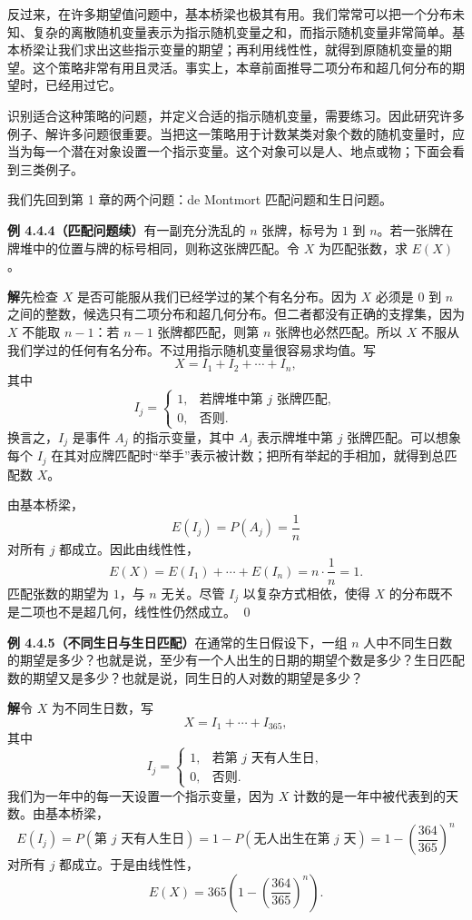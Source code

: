 \documentclass[UTF8, 12pt, fontset=fandol, oneside]{ctexart}
\begin{document}
反过来，在许多期望值问题中，基本桥梁也极其有用。我们常常可以把一个分布未知、复杂的离散随机变量表示为指示随机变量之和，而指示随机变量非常简单。基本桥梁让我们求出这些指示变量的期望；再利用线性性，就得到原随机变量的期望。这个策略非常有用且灵活。事实上，本章前面推导二项分布和超几何分布的期望时，已经用过它。

识别适合这种策略的问题，并定义合适的指示随机变量，需要练习。因此研究许多例子、解许多问题很重要。当把这一策略用于计数某类对象个数的随机变量时，应当为每一个潜在对象设置一个指示变量。这个对象可以是人、地点或物；下面会看到三类例子。

我们先回到第 1 章的两个问题：de Montmort 匹配问题和生日问题。

\noindent\textbf{例 4.4.4（匹配问题续）}\quad 有一副充分洗乱的 $n$ 张牌，标号为 $1$ 到 $n$。若一张牌在牌堆中的位置与牌的标号相同，则称这张牌匹配。令 $X$ 为匹配张数，求 $E(X)$。

\noindent\textbf{解}\quad 先检查 $X$ 是否可能服从我们已经学过的某个有名分布。因为 $X$ 必须是 $0$ 到 $n$ 之间的整数，候选只有二项分布和超几何分布。但二者都没有正确的支撑集，因为 $X$ 不能取 $n-1$：若 $n-1$ 张牌都匹配，则第 $n$ 张牌也必然匹配。所以 $X$ 不服从我们学过的任何有名分布。不过用指示随机变量很容易求均值。写
\[
  X=I_1+I_2+\cdots+I_n,
\]
其中
\[
  I_j=
  \begin{cases}
    1, & \text{若牌堆中第 }j\text{ 张牌匹配},\\
    0, & \text{否则}.
  \end{cases}
\]
换言之，$I_j$ 是事件 $A_j$ 的指示变量，其中 $A_j$ 表示牌堆中第 $j$ 张牌匹配。可以想象每个 $I_j$ 在其对应牌匹配时“举手”表示被计数；把所有举起的手相加，就得到总匹配数 $X$。

由基本桥梁，
\[
  E(I_j)=P(A_j)=\frac{1}{n}
\]
对所有 $j$ 都成立。因此由线性性，
\[
  E(X)=E(I_1)+\cdots+E(I_n)=n\cdot\frac{1}{n}=1.
\]
匹配张数的期望为 $1$，与 $n$ 无关。尽管 $I_j$ 以复杂方式相依，使得 $X$ 的分布既不是二项也不是超几何，线性性仍然成立。 \qed

\noindent\textbf{例 4.4.5（不同生日与生日匹配）}\quad 在通常的生日假设下，一组 $n$ 人中不同生日数的期望是多少？也就是说，至少有一个人出生的日期的期望个数是多少？生日匹配数的期望又是多少？也就是说，同生日的人对数的期望是多少？

\noindent\textbf{解}\quad 令 $X$ 为不同生日数，写
\[
  X=I_1+\cdots+I_{365},
\]
其中
\[
  I_j=
  \begin{cases}
    1, & \text{若第 }j\text{ 天有人生日},\\
    0, & \text{否则}.
  \end{cases}
\]
我们为一年中的每一天设置一个指示变量，因为 $X$ 计数的是一年中被代表到的天数。由基本桥梁，
\[
  E(I_j)=P(\text{第 }j\text{ 天有人生日})
  =1-P(\text{无人出生在第 }j\text{ 天})
  =1-\left(\frac{364}{365}\right)^n
\]
对所有 $j$ 都成立。于是由线性性，
\[
  E(X)=365\left(1-\left(\frac{364}{365}\right)^n\right).
\]
\end{document}
